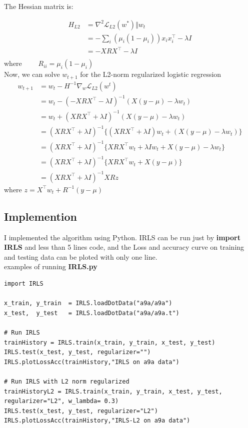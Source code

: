 \documentclass[a4paper]{article}
\begin{document}
The Hessian matrix is:

\begin{equation}
    \begin{aligned}
    H_{L2} &=\nabla^2{\mathcal{L}_{L2}(w^*)} \Vert w_t \\
    &= - \sum_{i}{(\mu_i(1-\mu_i))}x_i x_i^{\top} - \lambda I\\
    &= - XRX^{\top} - \lambda I\\
    \end{aligned}
\end{equation}
where $\qquad R_{ii} =\mu_i(1-\mu_i)$\\

Now, we can solve $w_{t+1}$ for the L2-norm regularized logistic regression
\begin{equation}
    \begin{aligned}
    w_{t+1} &=w_{t} - H^{-1} \nabla_w{\mathcal{L}_{L2}(w^t)}\\
    &= w_{t} - (-XRX^{\top} - \lambda I)^{-1}  (X(y-\mu) - \lambda w_t)\\
    &= w_{t} + (XRX^{\top} + \lambda I)^{-1}  (X(y-\mu) - \lambda w_t)\\
    &= (XRX^{\top} + \lambda I)^{-1} \{ (XRX^{\top} + \lambda I)w_t + (X(y-\mu) - \lambda w_t) \} \\
    &= (XRX^{\top} + \lambda I)^{-1} \{ XRX^{\top} w_t + \lambda I w_t + X(y-\mu) - \lambda w_t \}\\
    &= (XRX^{\top} + \lambda I)^{-1} \{ XRX^{\top} w_t + X(y-\mu) \}\\
    &=  (XRX^{\top} + \lambda I)^{-1} XRz
    \end{aligned}
\end{equation}
where $z=X^{\top} w_t + R^{-1}(y-\mu)$


\subsection{Implemention}

 I implemented the algorithm using Python. IRLS can be run just by \textbf{import IRLS} and less than 5 lines code, and the Loss and accuracy curve on training and testing data can be ploted with only one line.\\


examples of running \textbf{IRLS.py}\\

\begin{verbatim}
import IRLS

x_train, y_train  = IRLS.loadDotData("a9a/a9a")
x_test,  y_test   = IRLS.loadDotData("a9a/a9a.t")

# Run IRLS
trainHistory = IRLS.train(x_train, y_train, x_test, y_test)
IRLS.test(x_test, y_test, regularizer="")
IRLS.plotLossAcc(trainHistory,"IRLS on a9a data")

# Run IRLS with L2 norm regularized
trainHistoryL2 = IRLS.train(x_train, y_train, x_test, y_test, regularizer="L2", w_lambda= 0.3)
IRLS.test(x_test, y_test, regularizer="L2")
IRLS.plotLossAcc(trainHistory,"IRLS-L2 on a9a data")
\end{verbatim}
\end{document}
